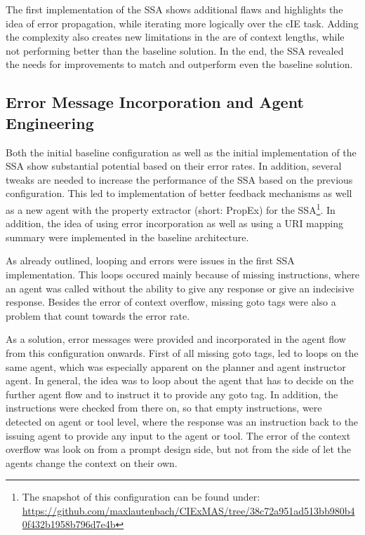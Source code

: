 \documentclass[a4paper,oneside,bibliography=totoc]{scrbook}
\begin{document}
The first implementation of the \ac{SSA} shows additional flaws and highlights the idea of error propagation, while iterating more logically over the \ac{cIE} task. Adding the complexity also creates new limitations in the are of context lengths, while not performing better than the baseline solution. In the end, the \ac{SSA} revealed the needs for improvements to match and outperform even the baseline solution.

\subsection{Error Message Incorporation and Agent Engineering}
\label{subsec:error_message_incorporation}

Both the initial baseline configuration as well as the initial implementation of the \ac{SSA} show substantial potential based on their error rates. In addition, several tweaks are needed to increase the performance of the \ac{SSA} based on the previous configuration. This led to implementation of better feedback mechanisms as well as a new agent with the property extractor (short: PropEx) for the \ac{SSA}\footnote{The snapshot of this configuration can be found under: \url{https://github.com/maxlautenbach/CIExMAS/tree/38c72a951ad513bb980b40f432b1958b796d7e4b}}. In addition, the idea of using error incorporation as well as using a URI mapping summary were implemented in the baseline architecture.

As already outlined, looping and errors were issues in the first \ac{SSA} implementation. This loops occured mainly because of missing instructions, where an agent was called without the ability to give any response or give an indecisive response. Besides the error of context overflow, missing goto tags were also a problem that count towards the error rate.

As a solution, error messages were provided and incorporated in the agent flow from this configuration onwards. First of all missing goto tags, led to loops on the same agent, which was especially apparent on the planner and agent instructor agent. In general, the idea was to loop about the agent that has to decide on the further agent flow and to instruct it to provide any goto tag. In addition, the instructions were checked from there on, so that empty instructions, were detected on agent or tool level, where the response was an instruction back to the issuing agent to provide any input to the agent or tool. The error of the context overflow was look on from a prompt design side, but not from the side of let the agents change the context on their own.
\end{document}
